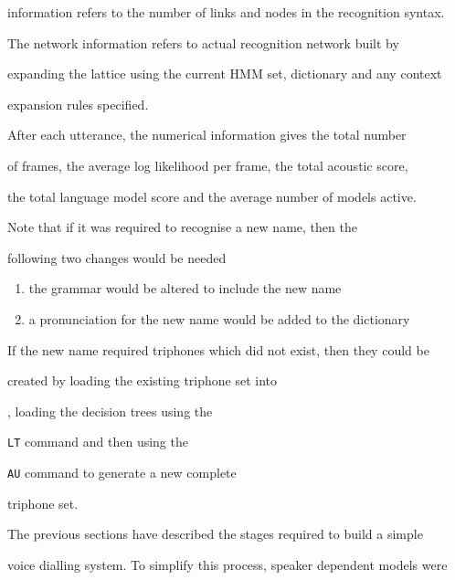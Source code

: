 information refers to the number of links and nodes in the recognition syntax.


The network information refers to actual recognition network built by


expanding the lattice using the current HMM set, dictionary and any context


expansion rules specified.


After each utterance, the numerical information gives the total number


of frames, the average log likelihood per frame, the total acoustic score,


the total language model score and the average number of models active.





Note that if it was required to recognise a new name, then the


following two changes would be needed


\begin{enumerate}


\item the grammar would be altered to include the new name


\item a pronunciation for the new name would be added to the dictionary


\end{enumerate}


If the new name required triphones which did not exist, then they could be


created by loading the existing triphone set into


, loading the decision trees using the


\texttt{LT} command and then using the


\texttt{AU} command to generate a new complete


triphone set.










The previous sections have described the stages required to build a simple 


voice dialling system. To simplify this process, speaker dependent models were 


